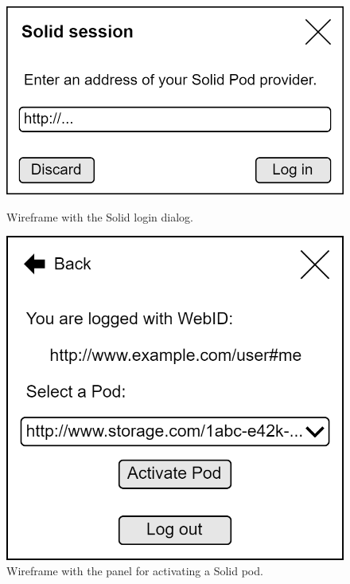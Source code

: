 \begin{figure}
  \begin{minipage}{0.48\textwidth}
    \centering
    \includegraphics[width=\linewidth]{img/design/ui-solid-dialog.png}
    \caption{Wireframe with the Solid login dialog.}
    \label{fig:ui-solid-dialog}
  \end{minipage}
  \hfill
  \begin{minipage}{0.48\textwidth}
    \centering
    \includegraphics[width=\linewidth]{img/design/ui-solid-panel.png}
    \caption{Wireframe with the panel for activating a Solid pod.}
    \label{fig:ui-solid-panel}
  \end{minipage}
\end{figure}

